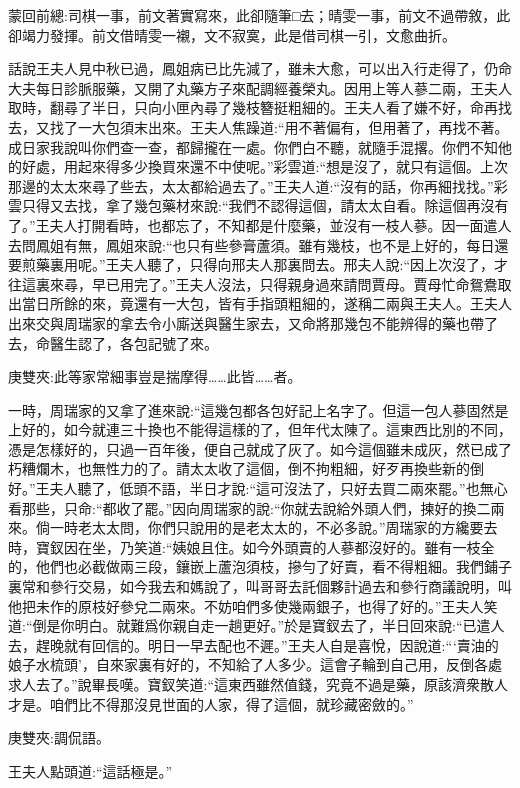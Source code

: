 

\begin{parag}
    \begin{note}蒙回前總:司棋一事，前文著實寫來，此卻隨筆□去；晴雯一事，前文不過帶敘，此卻竭力發揮。前文借晴雯一襯，文不寂寞，此是借司棋一引，文愈曲折。\end{note}
\end{parag}


\begin{parag}
    話說王夫人見中秋已過，鳳姐病已比先減了，雖未大愈，可以出入行走得了，仍命大夫每日診脈服藥，又開了丸藥方子來配調經養榮丸。因用上等人蔘二兩，王夫人取時，翻尋了半日，只向小匣內尋了幾枝簪挺粗細的。王夫人看了嫌不好，命再找去，又找了一大包須末出來。王夫人焦躁道:“用不著偏有，但用著了，再找不著。成日家我說叫你們查一查，都歸攏在一處。你們白不聽，就隨手混撂。你們不知他的好處，用起來得多少換買來還不中使呢。”彩雲道:“想是沒了，就只有這個。上次那邊的太太來尋了些去，太太都給過去了。”王夫人道:“沒有的話，你再細找找。”彩雲只得又去找，拿了幾包藥材來說:“我們不認得這個，請太太自看。除這個再沒有了。”王夫人打開看時，也都忘了，不知都是什麼藥，並沒有一枝人蔘。因一面遣人去問鳳姐有無，鳳姐來說:“也只有些參膏蘆須。雖有幾枝，也不是上好的，每日還要煎藥裏用呢。”王夫人聽了，只得向邢夫人那裏問去。邢夫人說:“因上次沒了，才往這裏來尋，早已用完了。”王夫人沒法，只得親身過來請問賈母。賈母忙命鴛鴦取出當日所餘的來，竟還有一大包，皆有手指頭粗細的，遂稱二兩與王夫人。王夫人出來交與周瑞家的拿去令小廝送與醫生家去，又命將那幾包不能辨得的藥也帶了去，命醫生認了，各包記號了來。\begin{note}庚雙夾:此等家常細事豈是揣摩得……此皆……者。\end{note}
\end{parag}


\begin{parag}
    一時，周瑞家的又拿了進來說:“這幾包都各包好記上名字了。但這一包人蔘固然是上好的，如今就連三十換也不能得這樣的了，但年代太陳了。這東西比別的不同，憑是怎樣好的，只過一百年後，便自己就成了灰了。如今這個雖未成灰，然已成了朽糟爛木，也無性力的了。請太太收了這個，倒不拘粗細，好歹再換些新的倒好。”王夫人聽了，低頭不語，半日才說:“這可沒法了，只好去買二兩來罷。”也無心看那些，只命:“都收了罷。”因向周瑞家的說:“你就去說給外頭人們，揀好的換二兩來。倘一時老太太問，你們只說用的是老太太的，不必多說。”周瑞家的方纔要去時，寶釵因在坐，乃笑道:“姨娘且住。如今外頭賣的人蔘都沒好的。雖有一枝全的，他們也必截做兩三段，鑲嵌上蘆泡須枝，摻勻了好賣，看不得粗細。我們鋪子裏常和參行交易，如今我去和媽說了，叫哥哥去託個夥計過去和參行商議說明，叫他把未作的原枝好參兌二兩來。不妨咱們多使幾兩銀子，也得了好的。”王夫人笑道:“倒是你明白。就難爲你親自走一趟更好。”於是寶釵去了，半日回來說:“已遣人去，趕晚就有回信的。明日一早去配也不遲。”王夫人自是喜悅，因說道:“‘賣油的娘子水梳頭’，自來家裏有好的，不知給了人多少。這會子輪到自己用，反倒各處求人去了。”說畢長嘆。寶釵笑道:“這東西雖然值錢，究竟不過是藥，原該濟衆散人才是。咱們比不得那沒見世面的人家，得了這個，就珍藏密斂的。”\begin{note}庚雙夾:調侃語。\end{note}王夫人點頭道:“這話極是。”
\end{parag}



